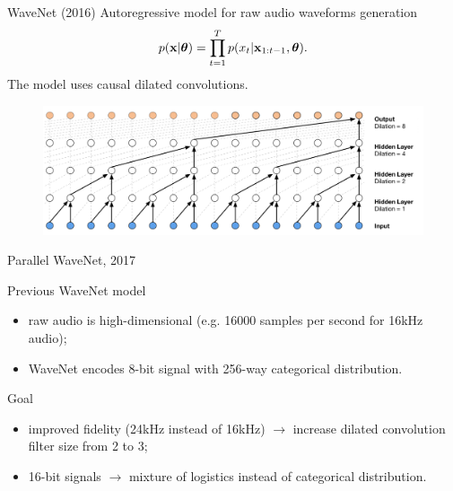 \begin{frame}{WaveNet (2016)}
	Autoregressive model for raw audio waveforms generation
	\vspace{-0.2cm}
	\[
	p(\mathbf{x}| \boldsymbol{\theta}) = \prod_{t=1}^T p(x_t|\mathbf{x}_{1:t-1}, \boldsymbol{\theta}).
	\]
	\vspace{-0.2cm}
	The model uses causal dilated convolutions.
	\begin{figure}
		\centering
		\includegraphics[width=0.9\linewidth]{figs/wavenet2.png}
	\end{figure}
\end{frame}
\begin{frame}{Parallel WaveNet, 2017}
	\begin{block}{Previous WaveNet model}
		\begin{itemize}
			\item raw audio is high-dimensional (e.g. 16000 samples per second for 16kHz audio);
			\item WaveNet encodes 8-bit signal with 256-way categorical distribution.
		\end{itemize}
	\end{block}
	\begin{block}{Goal}
		\begin{itemize}
			\item improved fidelity (24kHz instead of 16kHz) $\rightarrow$ increase dilated convolution filter size from 2 to 3;
			\item 16-bit signals $\rightarrow$ mixture of logistics instead of categorical distribution.
		\end{itemize}
	\end{block}
\end{frame}

